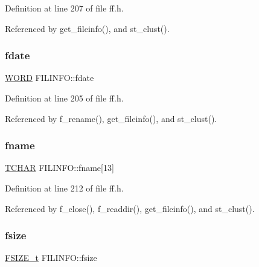 Definition at line 207 of file ff.\+h.



Referenced by get\+\_\+fileinfo(), and st\+\_\+clust().

\mbox{\label{structFILINFO_a7c01c48a15b1b49da459924437b0bd52}} 
\subsubsection{\texorpdfstring{fdate}{fdate}}
{\footnotesize\ttfamily \hyperlink{integer_8h_a197942eefa7db30960ae396d68339b97}{W\+O\+RD} F\+I\+L\+I\+N\+F\+O\+::fdate}



Definition at line 205 of file ff.\+h.



Referenced by f\+\_\+rename(), get\+\_\+fileinfo(), and st\+\_\+clust().

\mbox{\label{structFILINFO_abd852510f2f79b4ec773156d8942dc7c}} 
\subsubsection{\texorpdfstring{fname}{fname}}
{\footnotesize\ttfamily \hyperlink{ff_8h_a03bdb8ce5895c7e261aadc2529637546}{T\+C\+H\+AR} F\+I\+L\+I\+N\+F\+O\+::fname\mbox{[}13\mbox{]}}



Definition at line 212 of file ff.\+h.



Referenced by f\+\_\+close(), f\+\_\+readdir(), get\+\_\+fileinfo(), and st\+\_\+clust().

\mbox{\label{structFILINFO_a9e5b78ed7190f73de3ebcbdfbd6d1844}} 
\subsubsection{\texorpdfstring{fsize}{fsize}}
{\footnotesize\ttfamily \hyperlink{ff_8h_a3fc0992ad7436250b6b1a0592214b7f2}{F\+S\+I\+Z\+E\+\_\+t} F\+I\+L\+I\+N\+F\+O\+::fsize}



